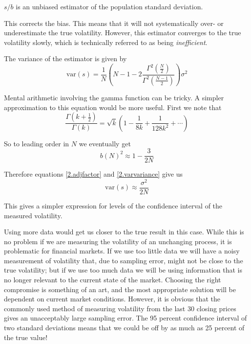 \documentclass[11pt]{report}
\begin{document}
		$s/b$ is an unbiased estimator of the population standard deviation.

		This corrects the bias. This means that it will not systematically over- or underestimate the true volatility. However, this estimator converges to the true volatility slowly, which is technically referred to as being \textit{inefficient}.

		The variance of the estimator is given by
		\begin{equation}
			\text{var}(s) = \frac{1}{N} \left(N - 1 - 2\frac{\Gamma^2\left(\frac{N}{2}\right)}{\Gamma^2\left(\frac{N - 1}{2}\right)}\right) \sigma^2
			\label{2.varvariance}
		\end{equation}

		Mental arithmetic involving the gamma function can be tricky. A simpler approximation to this equation would be more useful. First we note that
		\begin{equation}
			\frac{\Gamma \left(k + \frac{1}{2}\right)}{\Gamma(k)} = \sqrt{k} (1 - \frac{1}{8k} + \frac{1}{128k^2} + \cdots)
		\end{equation}

		So to leading order in $N$ we eventually get
		\begin{equation}
			b(N)^2 \approx 1 - \frac{3}{2N}
		\end{equation}

		Therefore equations \eqref{2.adjfactor} and \eqref{2.varvariance} give us
		\begin{equation}
			\text{var}(s) \approx \frac{\sigma^2}{2N}
		\end{equation}

		This gives a simpler expression for levels of the confidence interval of the measured volatility.
		
		Using more data would get us closer to the true result in this case. While this is no problem if we are measuring the volatility of an unchanging process, it is problematic for financial markets. If we use too little data we will have a noisy measurement of volatility that, due to sampling error, might not be close to the true volatility; but if we use too much data we will be using information that is no longer relevant to the current state of the market. Choosing the right compromise is something of an art, and the most appropriate solution will be dependent on current market conditions. However, it is obvious that the commonly used method of measuring volatility from the last 30 closing prices gives an unacceptably large sampling error. The 95 percent confidence interval of two standard deviations means that we could be off by as much as 25 percent of the true value!
		
\end{document}
